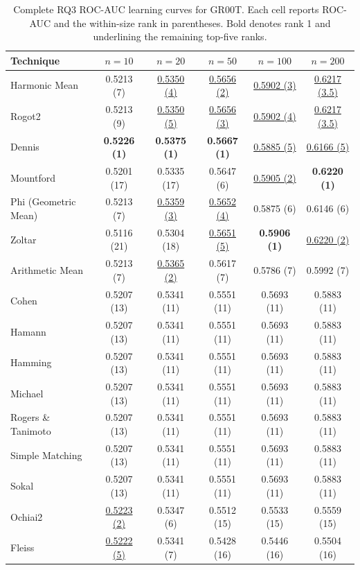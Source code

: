 \begin{table}[t]
\centering
\caption{Complete RQ3 ROC-AUC learning curves for GR00T. Each cell reports ROC-AUC and the within-size rank in parentheses. Bold denotes rank 1 and underlining the remaining top-five ranks.}
\label{tab:rq3v2-learning-curves-gr00t}
{\scriptsize
\setlength{\tabcolsep}{5pt}
\begin{tabular}{lccccc}
\toprule
Technique & $n=10$ & $n=20$ & $n=50$ & $n=100$ & $n=200$ \\
\midrule
Harmonic Mean & 0.5213 (7) & \underline{0.5350 (4)} & \underline{0.5656 (2)} & \underline{0.5902 (3)} & \underline{0.6217 (3.5)} \\
Rogot2 & 0.5213 (9) & \underline{0.5350 (5)} & \underline{0.5656 (3)} & \underline{0.5902 (4)} & \underline{0.6217 (3.5)} \\
Dennis & \textbf{0.5226 (1)} & \textbf{0.5375 (1)} & \textbf{0.5667 (1)} & \underline{0.5885 (5)} & \underline{0.6166 (5)} \\
Mountford & 0.5201 (17) & 0.5335 (17) & 0.5647 (6) & \underline{0.5905 (2)} & \textbf{0.6220 (1)} \\
Phi (Geometric Mean) & 0.5213 (7) & \underline{0.5359 (3)} & \underline{0.5652 (4)} & 0.5875 (6) & 0.6146 (6) \\
Zoltar & 0.5116 (21) & 0.5304 (18) & \underline{0.5651 (5)} & \textbf{0.5906 (1)} & \underline{0.6220 (2)} \\
Arithmetic Mean & 0.5213 (7) & \underline{0.5365 (2)} & 0.5617 (7) & 0.5786 (7) & 0.5992 (7) \\
Cohen & 0.5207 (13) & 0.5341 (11) & 0.5551 (11) & 0.5693 (11) & 0.5883 (11) \\
Hamann & 0.5207 (13) & 0.5341 (11) & 0.5551 (11) & 0.5693 (11) & 0.5883 (11) \\
Hamming & 0.5207 (13) & 0.5341 (11) & 0.5551 (11) & 0.5693 (11) & 0.5883 (11) \\
Michael & 0.5207 (13) & 0.5341 (11) & 0.5551 (11) & 0.5693 (11) & 0.5883 (11) \\
Rogers \& Tanimoto & 0.5207 (13) & 0.5341 (11) & 0.5551 (11) & 0.5693 (11) & 0.5883 (11) \\
Simple Matching & 0.5207 (13) & 0.5341 (11) & 0.5551 (11) & 0.5693 (11) & 0.5883 (11) \\
Sokal & 0.5207 (13) & 0.5341 (11) & 0.5551 (11) & 0.5693 (11) & 0.5883 (11) \\
Ochiai2 & \underline{0.5223 (2)} & 0.5347 (6) & 0.5512 (15) & 0.5533 (15) & 0.5559 (15) \\
Fleiss & \underline{0.5222 (5)} & 0.5341 (7) & 0.5428 (16) & 0.5446 (16) & 0.5504 (16) \\

\end{tabular}}
\end{table}

